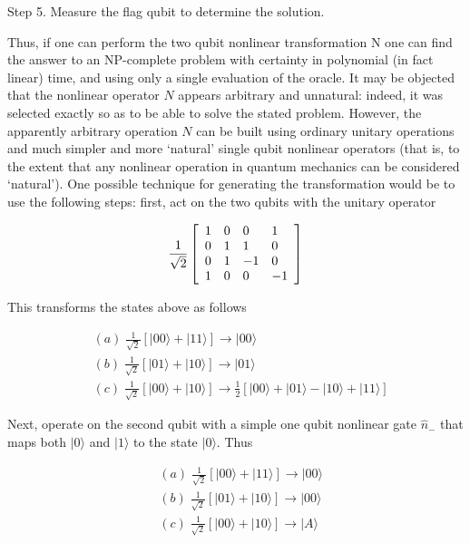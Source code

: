 \documentclass[12pt]{article}
\begin{document}
Step 5. Measure the flag qubit to determine the solution.

Thus, if one can perform the two qubit nonlinear transformation N one can find
the answer to an NP-complete problem with certainty in polynomial (in fact
linear) time, and using only a single evaluation of the oracle. It may be
objected that the nonlinear operator $N$ appears arbitrary and unnatural:
indeed, it was selected exactly so as to be able to solve the stated problem.
However, the apparently arbitrary operation $N$ can be built using ordinary
unitary operations and much simpler and more `natural' single qubit nonlinear
operators (that is, to the extent that any nonlinear operation in quantum
mechanics can be considered `natural'). One possible technique for generating
the transformation would be to use the following steps: first, act on the two
qubits with the unitary operator

\begin{equation}
\frac{1}{\sqrt{2}}\left[
\begin{array}
[c]{llll}%
1 & 0 & 0 & 1\\
0 & 1 & 1 & 0\\
0 & 1 & -1 & 0\\
1 & 0 & 0 & -1
\end{array}
\right]
\end{equation}

This transforms the states above as follows%

\begin{align}
&  (a)\;\frac{1}{\sqrt{2}}\left[  |00\rangle+|11\rangle\right]
\longrightarrow|00\rangle\nonumber\\
&  (b)\;\frac{1}{\sqrt{2}}\left[  |01\rangle+|10\rangle\right]
\longrightarrow|01\rangle\\
&  (c)\;\frac{1}{\sqrt{2}}\left[  |00\rangle+|10\rangle\right]
\longrightarrow\frac{1}{2}\left[  |00\rangle+|01\rangle-|10\rangle
+|11\rangle\right] \nonumber
\end{align}

Next, operate on the second qubit with a simple one qubit nonlinear gate
$\widehat{n}_{-}$ that maps both
$\vert 0 \rangle$
and
$\vert 1 \rangle$
to the state
$\vert 0 \rangle$. Thus%

\begin{align}
&  (a)\;\frac{1}{\sqrt{2}}\left[  |00\rangle+|11\rangle\right]
\longrightarrow|00\rangle\nonumber\\
&  (b)\;\frac{1}{\sqrt{2}}\left[  |01\rangle+|10\rangle\right]
\longrightarrow|00\rangle\\
&  (c)\;\frac{1}{\sqrt{2}}\left[  |00\rangle+|10\rangle\right]
\longrightarrow|A\rangle\nonumber
\end{align}
\end{document}
